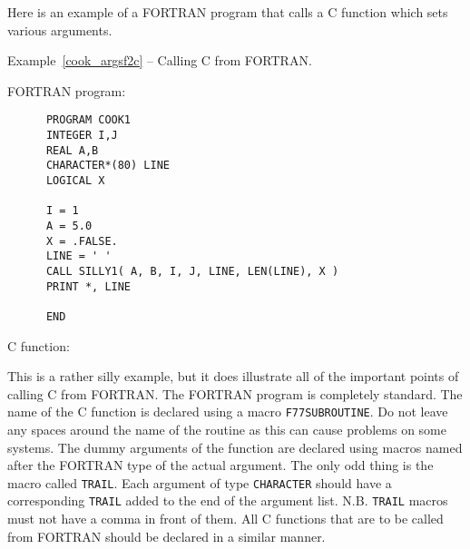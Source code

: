 \documentclass[twoside,11pt]{article}
\newcommand{\latex}[1]{#1}
\renewcommand{\_}{\texttt{\symbol{95}}}
\newcounter{examples}
\begin{document}
Here is an example of a FORTRAN program that calls a C function which sets
various arguments.

\begin{samepage}
\label{cook_argsf2c}
\begin{center}
Example\latex{~\ref{cook_argsf2c}}
-- Calling C from FORTRAN\@.
\end{center}
FORTRAN program:
{\small \begin{verbatim}
      PROGRAM COOK1
      INTEGER I,J
      REAL A,B
      CHARACTER*(80) LINE
      LOGICAL X

      I = 1
      A = 5.0
      X = .FALSE.
      LINE = ' '
      CALL SILLY1( A, B, I, J, LINE, LEN(LINE), X )
      PRINT *, LINE

      END
\end{verbatim} }
\end{samepage}
C function:

This is a rather silly example, but it does illustrate all of the important
points of calling C from FORTRAN\@. The FORTRAN program is completely standard.
The name of the C function is declared using a macro \texttt{F77\_\-SUBROUTINE}.
Do not leave any spaces around the name of the routine as this can cause 
problems on some systems. 
The dummy arguments of the function are declared using macros
named after the FORTRAN type of the actual argument. The only odd thing is the
macro called \texttt{TRAIL}. 
Each argument of type \texttt{CHARACTER} should have a corresponding 
\texttt{TRAIL} added to the end of the argument list. N.B. \texttt{TRAIL} 
macros must not have a comma in front of them. 
All C functions that are to be called from FORTRAN should be declared in a 
similar manner.
\end{document}
